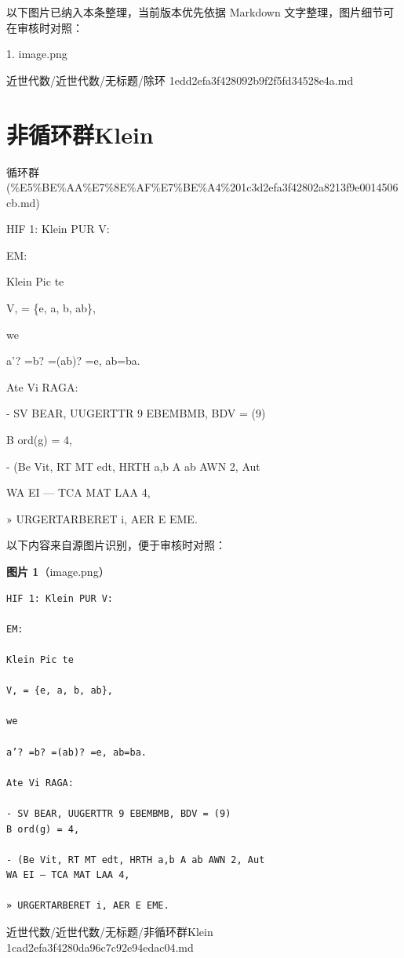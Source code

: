 \begin{note}[关联图片]
以下图片已纳入本条整理，当前版本优先依据 Markdown 文字整理，图片细节可在审核时对照：

1. image.png\\

\end{note}

\begin{note}[来源路径]

近世代数/近世代数/无标题/除环 1edd2efa3f428092b9f2f5fd34528e4a.md

\end{note}

\section*{非循环群Klein}

\begin{note}[来源上级主题]

循环群 (\%E5\%BE\%AA\%E7\%8E\%AF\%E7\%BE\%A4\%201c3d2efa3f42802a8213f9e0014506cb.md)

\end{note}

\begin{note}[非循环群Klein]

HIF 1: Klein PUR V:

EM:

Klein Pic te

V, = \{e, a, b, ab\},

we

a’? =b? =(ab)? =e, ab=ba.

Ate Vi RAGA:

- SV BEAR, UUGERTTR 9 EBEMBMB, BDV = (9)

B ord(g) = 4,

- (Be Vit, RT MT edt, HRTH a,b A ab AWN 2, Aut

WA EI — TCA MAT LAA 4,

» URGERTARBERET i, AER E EME.

\end{note}

\begin{note}
以下内容来自源图片识别，便于审核时对照：

\textbf{图片 1}（image.png）
\begin{Verbatim}[fontsize=\small]
HIF 1: Klein PUR V:

EM:

Klein Pic te

V, = {e, a, b, ab},

we

a’? =b? =(ab)? =e, ab=ba.

Ate Vi RAGA:

- SV BEAR, UUGERTTR 9 EBEMBMB, BDV = (9)
B ord(g) = 4,

- (Be Vit, RT MT edt, HRTH a,b A ab AWN 2, Aut
WA EI — TCA MAT LAA 4,

» URGERTARBERET i, AER E EME.
\end{Verbatim}

\end{note}

\begin{note}[来源路径]

近世代数/近世代数/无标题/非循环群Klein 1cad2efa3f4280da96c7c92e94edac04.md

\end{note}
